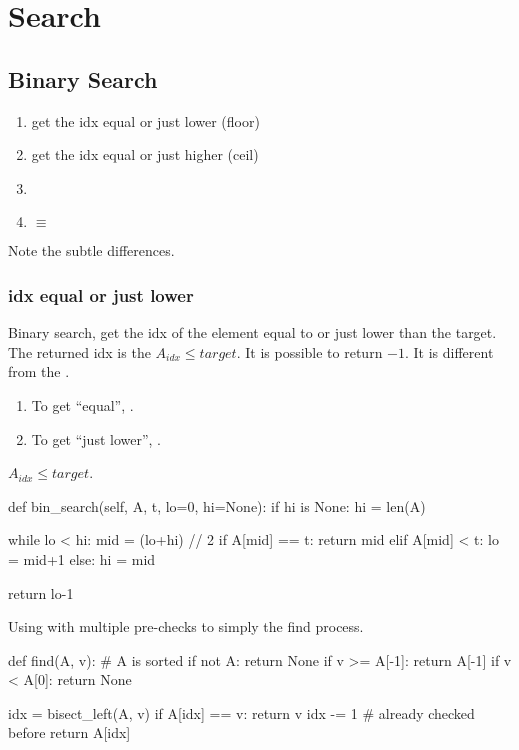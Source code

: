 \chapter{Search}

\section{Binary Search}
\begin{enumerate}
\item get the idx equal or just lower (floor)
\item get the idx equal or just higher (ceil)
\item {}
\item {} $\equiv$  
\end{enumerate}

Note the subtle differences.

\subsection{idx equal or just lower}
Binary search, get the idx of the element equal to or just lower than the target. The returned idx is the $A_{idx} \leq target$. It is possible to return $-1$. It is different from the .

\begin{enumerate}
\item To get ``equal'', .
\item To get ``just lower'', .
\end{enumerate}
$A_{idx} \leq target$.
\begin{python}
def bin_search(self, A, t, lo=0, hi=None):
    if hi is None: hi = len(A)
    
    while lo < hi:
        mid = (lo+hi) // 2
        if A[mid] == t:  return mid
        elif A[mid] < t: lo = mid+1
        else:            hi = mid

    return lo-1
\end{python}

Using  with multiple pre-checks to simply the find process.
\begin{python}
def find(A, v):
  # A is sorted 
  if not A:
    return None
  if v >= A[-1]:
    return A[-1]
  if v < A[0]:
    return None
    
  idx = bisect_left(A, v)
  if A[idx] == v:
    return v
  idx -= 1  # already checked before
  return A[idx]
\end{python}

